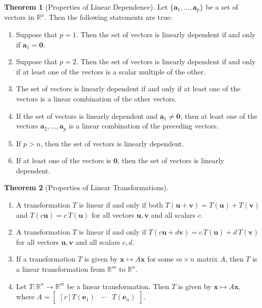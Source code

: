 \documentclass{myart}
\renewcommand{\vec}[1]{\ensuremath{\mathbf{#1}}} %
\newcommand{\mat}[1]{\ensuremath{#1}} %
\newcommand{\R}[1][]{\ensuremath{\mathbb{R}^{#1}}} %
\newcommand{\by}{\ensuremath{\times}} %
\newcommand{\MAT}[2][r]{\ensuremath{\begin{bmatrix*}[#1]#2\end{bmatrix*}}} %
\newcommand{\set}[1]{\ensuremath{\{#1\}}} %
\newcommand{\many}[2][n]{\ensuremath{{#2}_1, \ldots, {#2}_{#1}}} %
\theoremstyle{definition}
\newtheorem{thm}{Theorem}
\begin{document}
\begin{thm}[Properties of Linear Dependence]
Let \set{\many[p]{\vec a}} be a set of vectors in \R[n]. Then the following statements are true:
\begin{enumerate}
\item Suppose that $p = 1$. Then the set of vectors is linearly dependent if and only if $\vec a_1 = \vec 0$.
\item Suppose that $p = 2$. Then the set of vectors is linearly dependent if and only if at least one of the vectors is a scalar multiple of the other.
\item The set of vectors is linearly dependent if and only if at least one of the vectors is a linear combination of the other vectors.
\item If the set of vectors is linearly dependent and $\vec a_1 \neq \vec 0$, then at least one of the vectors $\vec a_2, \ldots, \vec a_p$ is a linear combination of the preceding vectors.
\item If $p > n$, then the set of vectors is linearly dependent.
\item If at least one of the vectors is \vec 0, then the set of vectors is linearly dependent.
\end{enumerate}
\end{thm}

\begin{thm}[Properties of Linear Transformations] \hfill
\begin{enumerate}
\item A transformation $T$ is linear if and only if both $T(\vec u + \vec v) = T(\vec u) + T(\vec v)$ and $T(c \vec u) = c\, T(\vec u)$ for all vectors $\vec u, \vec v$ and all scalars $c$.
\item A transformation $T$ is linear if and only if $T(c\vec u + d\vec v) = c\,T(\vec u) + d\,T(\vec v)$ for all vectors $\vec u, \vec v$ and all scalars $c, d$.
\item If a transformation $T$ is given by $\vec x \mapsto \mat A\vec x$ for some $m \by n$ matrix \mat A, then $T$ is a linear transformation from \R[m] to \R[n].
\item Let $T : \R[n] \to \R[m]$ be a linear transformation. Then $T$ is given by $\vec x \mapsto \mat A \vec x$, where $\mat A = \MAT{ T(\vec e_1) & \cdots & T(\vec e_n) }$.
\end{enumerate}
\end{thm}
\end{document}
